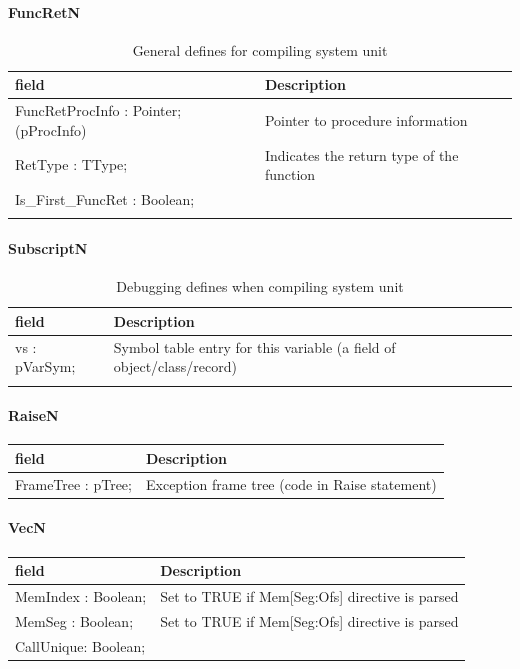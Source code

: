 \documentclass [a4paper,12pt]{article}
\begin{document}
\paragraph{FuncRetN}\mbox{}

\begin{longtable}{|l|p{10cm}|}
\hline
field	& Description \\
\hline
\endhead
\hline
\endfoot
\textsf{FuncRetProcInfo : Pointer; (pProcInfo)}&
	Pointer to procedure information  \\
\textsf{RetType : TType;}& Indicates the return type of the function \\
\textsf{Is{\_}First{\_}FuncRet : Boolean;}&  \\
\hline
\caption{General defines for compiling system unit}
\label{tab18}
\end{longtable}

\paragraph{SubscriptN}\mbox{}

\begin{longtable}{|l|p{10cm}|}
\hline
field	& Description \\
\hline
\endhead
\hline
\endfoot
\textsf{vs : pVarSym;}&
	Symbol table entry for this variable (a field of
	object/class/record) \\
\hline
\caption{Debugging defines when compiling system unit}
\end{longtable}

\paragraph{RaiseN}\mbox{}

\begin{longtable}{|l|p{10cm}|}
\hline
field	& Description \\
\hline
\endhead
\hline
\endfoot
\textsf{FrameTree : pTree;} & Exception frame tree (code in Raise statement)
\end{longtable}

\paragraph{VecN}\mbox{}

\begin{longtable}{|l|p{10cm}|}
\hline
field	& Description \\
\hline
\endhead
\hline
\endfoot
\textsf{MemIndex  : Boolean;} & Set to TRUE if Mem[Seg:Ofs] directive is parsed \\
\textsf{MemSeg 	  : Boolean;} & Set to TRUE if Mem[Seg:Ofs] directive is parsed \\
\textsf{CallUnique: Boolean;} &
\label{tab21}
\end{longtable}
\end{document}
